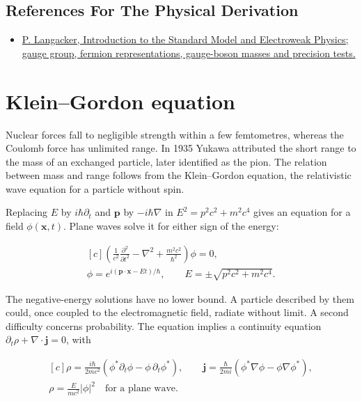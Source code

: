 \documentclass[11pt,oneside]{book}
\newenvironment{centeredalign}{\[\begin{gathered}[c]}{\end{gathered}\]}
\begin{document}
\subsection*{References For The Physical Derivation}
\begin{itemize}
\item \href{https://arxiv.org/abs/0901.0241}{P. Langacker, Introduction to the Standard Model and Electroweak Physics; gauge group, fermion representations, gauge-boson masses and precision tests.}
\end{itemize}





\clearpage

\section{Klein–Gordon equation}

\label{topic:klein-gordon-equation}

Nuclear forces fall to negligible strength within a few femtometres, whereas the Coulomb force has unlimited range. In 1935 Yukawa attributed the short range to the mass of an exchanged particle, later identified as the pion. The relation between mass and range follows from the Klein--Gordon equation, the relativistic wave equation for a particle without spin.

Replacing \(E\) by \(i\hbar\partial_t\) and \(\mathbf p\) by \(-i\hbar\nabla\) in \(E^2=p^2c^2+m^2c^4\) gives an equation for a field \(\phi(\mathbf x,t)\). Plane waves solve it for either sign of the energy:

\begin{centeredalign}
\left(\frac{1}{c^2}\frac{\partial^2}{\partial t^2}-\nabla^2+\frac{m^2c^2}{\hbar^2}\right)\phi=0,\\
\phi=e^{i(\mathbf p\cdot\mathbf x-Et)/\hbar},\qquad E=\pm\sqrt{p^2c^2+m^2c^4}.
\end{centeredalign}

The negative-energy solutions have no lower bound. A particle described by them could, once coupled to the electromagnetic field, radiate without limit. A second difficulty concerns probability. The equation implies a continuity equation \(\partial_t\rho+\nabla\cdot\mathbf j=0\), with

\begin{centeredalign}
\rho=\frac{i\hbar}{2mc^2}\left(\phi^*\partial_t\phi-\phi\,\partial_t\phi^*\right),\qquad
\mathbf j=\frac{\hbar}{2mi}\left(\phi^*\nabla\phi-\phi\nabla\phi^*\right),\\
\rho=\frac{E}{mc^2}|\phi|^2\quad\text{for a plane wave}.
\end{centeredalign}
\end{document}
